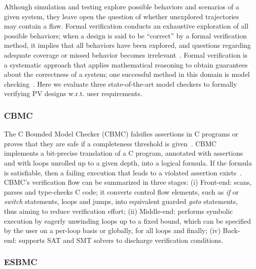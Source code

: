 Although simulation and testing explore possible behaviors and scenarios of a given system, 
they leave open the question of whether unexplored trajectories may contain a flaw. 
Formal verification conducts an exhaustive exploration of all possible behaviors; 
when a design is said to be ``correct'' by a formal verification method, it implies that all 
behaviors have been explored, and questions regarding adequate coverage or missed behavior 
becomes irrelevant~\cite{Clarke2012}. Formal verification is a systematic approach that 
applies mathematical reasoning to obtain guarantees about the correctness of a system; 
one successful method in this domain is model checking~\cite{Clarke2012}. 
Here we evaluate three state-of-the-art model checkers to formally verifying PV designs w.r.t. user requirements.

\subsubsection{CBMC}

The C Bounded Model Checker (CBMC) falsifies assertions in C programs 
or proves that they are safe if a completeness threshold is given~\cite{Kroening}. 
CBMC implements a bit-precise translation of a C program, annotated with assertions 
and with loops unrolled up to a given depth, into a logical formula. If the formula is satisfiable, 
then a failing execution that leads to a violated assertion exists~\cite{Kroening}. CBMC's verification 
flow can be summarized in three stages: (i) Front-end: scans, parses and type-checks C code; 
it converts control flow elements, such as \textit{if} or \textit{switch} statements, loops and jumps, 
into equivalent guarded \textit{goto} statements, thus aiming to reduce verification effort; 
(ii) Middle-end: performs symbolic execution by eagerly unwinding loops up to a fixed bound, 
which can be specified by the user on a per-loop basis or globally, for all loops and finally; 
(iv) Back-end: supports SAT and SMT solvers to discharge verification conditions.

\subsubsection{ESBMC}

